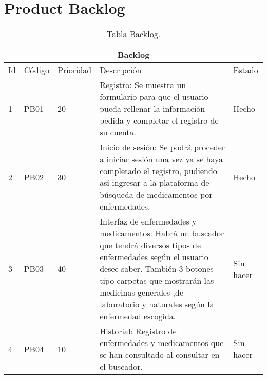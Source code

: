 \chapter{Product Backlog}


\begin{table}[htb]
	\centering
	\begin{tabular}{|l|p{2cm}|l|p{9cm}|l|}
		\hline
		\multicolumn{5}{|c|}{Backlog} \\ \hline
		Id & Código & Prioridad & Descripción & Estado \\
		\hline \hline
	
		1 & PB01 & 20 & Registro: Se muestra un formulario para que el usuario pueda rellenar la información pedida y completar el registro de su cuenta. & Hecho \\ \hline
		2 & PB02 & 30 & Inicio de sesión: Se podrá proceder a iniciar sesión una vez ya se haya completado el registro, pudiendo así ingresar a la plataforma de búsqueda de medicamentos por enfermedades. & Hecho \\ \hline
		
		3 & PB03 & 40 & Interfaz de enfermedades y medicamentos: Habrá un buscador que tendrá diversos tipos de enfermedades según el usuario desee saber. También 3 botones tipo carpetas que mostrarán las medicinas generales ,de laboratorio y naturales según la enfermedad escogida. & Sin hacer \\ \hline
		4 & PB04 & 10 & Historial: Registro de enfermedades y medicamentos que se han consultado al consultar en el buscador. & Sin hacer \\ \hline
	\end{tabular}
	\caption{Tabla Backlog.}
	\label{tabla:Backlog}
\end{table}
